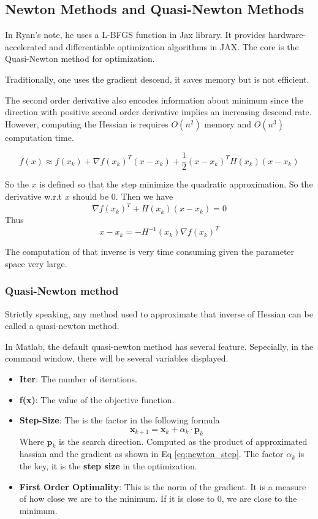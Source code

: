 \documentclass[../SQG_notes.tex]{subfiles}
\begin{document}
\subsection{Newton Methods and Quasi-Newton Methods}
In Ryan's note, he uses a L-BFGS function in Jax library. It provides hardware-accelerated and differentiable optimization algorithms in JAX. The core is the Quasi-Newton method for optimization.

Traditionally, one uses the gradient descend, it saves memory but is not efficient. 

The second order derivative also encodes information about minimum since the direction with positive second order derivative implies an increasing descend rate. However, computing the Hessian is requires $O(n^2)$ memory and $O(n^3)$ computation time.

\[ f(x) \approx f(x_k) + \nabla f(x_k)^T (x - x_k) + \frac{1}{2} (x - x_k)^T H(x_k) (x - x_k)\]

So the $x$ is defined so that the step minimize the quadratic approximation. So the derivative w.r.t $x$ should be 0. Then we have 
\[
\nabla f(x_k)^T + H(x_k) (x - x_k) = 0 
\]
Thus 
\begin{equation}
x - x_k = -H^{-1}(x_k) \nabla f(x_k)^T \label{eq:newton_step}
\end{equation}

The computation of that inverse is very time consuming given the parameter space very large. 

\subsubsection{Quasi-Newton method}

Strictly speaking, any method used to approximate that inverse of Hessian can be called a quasi-newton method. \par

In Matlab, the default quasi-newton method has several feature. Sepecially, in the command window, there will be several variables displayed. 
\begin{explanation}
    \begin{itemize}
        \item \textbf{Iter}: The number of iterations.
        \item \textbf{f(x)}: The value of the objective function.
        \item \textbf{Step-Size}: The is the factor in the following formula
        \[ \mathbf{x}_{k+1} = \mathbf{x}_k + \alpha_k \cdot \mathbf{p}_k\]
        Where $\mathbf{p}_k$ is the search direction. Computed as the product of approximated hassian and the gradient as shown in Eq \ref{eq:newton_step}. The factor $\alpha_k$ is the key, it is the \textbf{step size} in the optimization. \par
        \item \textbf{First Order Optimality}: This is the norm of the gradient. It is a measure of how close we are to the minimum. If it is close to 0, we are close to the minimum. 
    \end{itemize}
\end{explanation}
\end{document}
